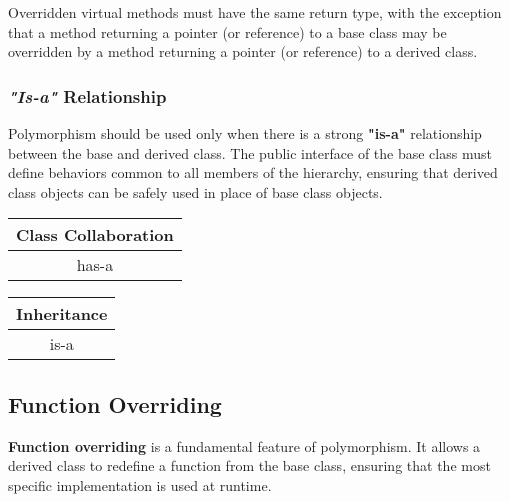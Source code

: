 \begin{warningblock}
    Overridden virtual methods must have the same return type, with the exception that a method returning a pointer (or reference) to a base class may be overridden by a method returning a pointer (or reference) to a derived class.
\end{warningblock}

\subsubsection{\textit{"Is-a"} Relationship}

Polymorphism should be used only when there is a strong \textbf{"is-a"} relationship between the base and derived class. The public interface of the base class must define behaviors common to all members of the hierarchy, ensuring that derived class objects can be safely used in place of base class objects.

\vspace{0.5em}

\begin{center}
\begin{minipage}{0.3\textwidth}
    \centering
    \renewcommand{\arraystretch}{1.2}
    \begin{tabular}{c}
        \textbf{Class Collaboration} \\
        \hline
        has-a \\
    \end{tabular}
\end{minipage}%
\begin{minipage}{0.3\textwidth}
    \centering
    \renewcommand{\arraystretch}{1.2}
    \begin{tabular}{c}
        \textbf{Inheritance} \\
        \hline
        is-a \\
    \end{tabular}
\end{minipage}
\end{center}

\subsection{Function Overriding}

\vspace{-0.5em}

\textbf{Function overriding} is a fundamental feature of polymorphism. It allows a derived class to redefine a function from the base class, ensuring that the most specific implementation is used at runtime.

